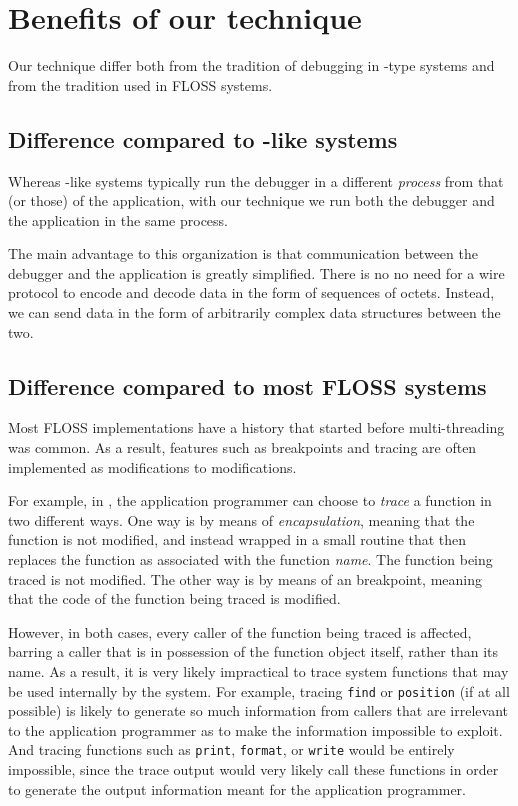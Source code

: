 \section{Benefits of our technique}
\label{sec-benefits}

Our technique differ both from the tradition of debugging in
\unix{}-type systems and from the tradition used in FLOSS
\commonlisp{} systems.

\subsection{Difference compared to \unix{}-like systems}

Whereas \unix{}-like systems typically run the debugger in a different
\emph{process} from that (or those) of the application, with our
technique we run both the debugger and the application in the same
process.

The main advantage to this organization is that communication between
the debugger and the application is greatly simplified.  There is no
no need for a wire protocol to encode and decode data in the form of
sequences of octets.  Instead, we can send data in the form of
arbitrarily complex data structures between the two.  

\subsection{Difference compared to most FLOSS \commonlisp{} systems}

Most FLOSS \commonlisp{} implementations have a history that started
before multi-threading was common.  As a result, features such as
breakpoints and tracing are often implemented as modifications to
modifications.

For example, in \sbcl{}, the application programmer can choose to
\emph{trace} a function in two different ways.  One way is by means of
\emph{encapsulation}, meaning that the function is not modified, and
instead wrapped in a small routine that then replaces the function as
associated with the function \emph{name}.  The function being traced
is not modified.  The other way is by means of an breakpoint, meaning
that the code of the function being traced is modified.

However, in both cases, every caller of the function being traced is
affected, barring a caller that is in possession of the function
object itself, rather than its name.  As a result, it is very likely
impractical to trace system functions that may be used internally by
the system.  For example, tracing \texttt{find} or \texttt{position}
(if at all possible) is likely to generate so much information from
callers that are irrelevant to the application programmer as to make
the information impossible to exploit.  And tracing functions such as
\texttt{print}, \texttt{format}, or \texttt{write} would be entirely
impossible, since the trace output would very likely call these
functions in order to generate the output information meant for the
application programmer.

